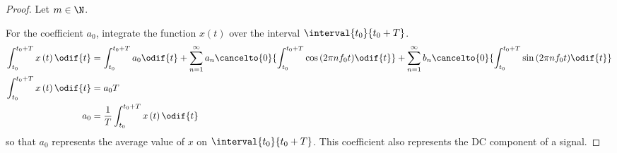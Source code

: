\documentclass{article}
\begin{document}
\begin{proof}
    Let \(m \in \N\).

    For the coefficient \(a_0\), integrate the function \(x\left( t
    \right)\) over the interval \(\interval{t_0}{t_0 + T}\).
    \begin{align*}
        \int_{t_0}^{t_0 + T} x\left( t \right) \odif{t} & = \int_{t_0}^{t_0 + T} a_0 \odif{t} + \sum_{n = 1}^\infty a_n \cancelto{0}{\int_{t_0}^{t_0 + T} \cos{\left( 2 \pi n f_0 t \right)} \odif{t}} + \sum_{n = 1}^\infty b_n \cancelto{0}{\int_{t_0}^{t_0 + T} \sin{\left( 2 \pi n f_0 t \right)} \odif{t}} \\
        \int_{t_0}^{t_0 + T} x\left( t \right) \odif{t} & = a_0 T                                                                                                                                                                                                                                               \\
        a_0                                             & = \frac{1}{T} \int_{t_0}^{t_0 + T} x\left( t \right) \odif{t}
    \end{align*}
    so that \(a_0\) represents the average value of \(x\) on \(\interval{t_0}{t_0 + T}\). This coefficient also
    represents the DC component of a signal.


\end{proof}
\end{document}
